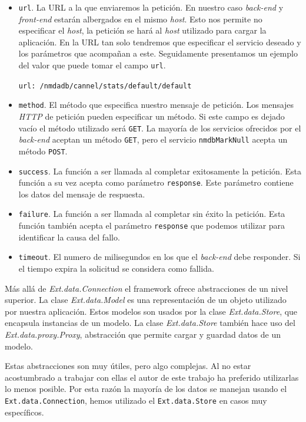 	\begin{itemize}
  		\item	\texttt{url}. 	La URL a la que enviaremos la petición. En nuestro caso \emph{back-end} y \emph{front-end} estarán albergados en
		  	el mismo \emph{host}. Esto nos permite no especificar el \emph{host}, la petición se hará al \emph{host} utilizado para cargar
			la aplicación. En la URL tan solo tendremos que especificar el servicio deseado y los parámetros que acompañan a este.
			Seguidamente presentamos un ejemplo del valor que puede tomar el campo \texttt{url}.
    				\begin{center} \texttt{url: \cc/nmdadb/cannel/stats/default/default\cc}  \end{center}
		\item	\texttt{method}. El método que especifica nuestro mensaje de petición. Los mensajes \emph{HTTP} de petición pueden especificar
		  	un método. Si este campo es dejado vacío el método utilizado será \texttt{GET}. La mayoría de los servicios ofrecidos por el
			\emph{back-end} aceptan un método \texttt{GET}, pero el servicio \texttt{nmdbMarkNull} acepta un método \texttt{POST}.
		\item	\texttt{success}. La función a ser llamada al completar exitosamente la petición. Esta función a su vez acepta como parámetro
		  	\texttt{response}. Este parámetro contiene los datos del mensaje de respuesta.
		\item	\texttt{failure}. La función a ser llamada al completar sin éxito la petición. Esta función también acepta el parámetro
		  	\texttt{response} que podemos utilizar para identificar la causa del fallo.
		\item	\texttt{timeout}. El numero de milisegundos en los que el \emph{back-end} debe responder. Si el tiempo expira la solicitud se
		  	considera como fallida. 
	\end{itemize}
	Más allá de \emph{Ext.data.Connection} el framework ofrece abstracciones de un nivel superior. La clase \emph{Ext.data.Model} es una
	representación de un objeto utilizado por nuestra aplicación. Estos modelos son usados por la clase \emph{Ext.data.Store}, que encapsula
	instancias de un modelo. La clase \emph{Ext.data.Store} también hace uso del \emph{Ext.data.proxy.Proxy}, abstracción que permite cargar y
	guardad datos de un modelo. 
	\par
	Estas abstracciones son muy útiles, pero algo complejas. Al no estar acostumbrado a trabajar con ellas el autor de este trabajo ha preferido
	utilizarlas lo menos posible. Por esta razón la mayoría de los datos se manejan usando el \texttt{Ext.data.Connection}, hemos utilizado el
	\texttt{Ext.data.Store} en casos muy específicos.

